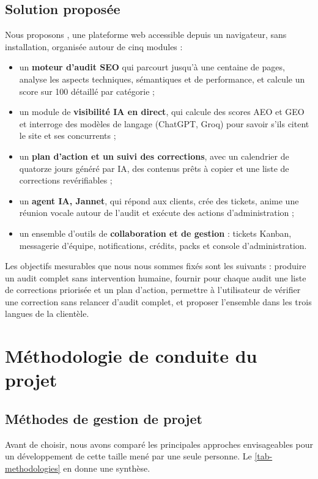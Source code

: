 \subsection{Solution proposée}
Nous proposons \xapp, une plateforme web accessible depuis un navigateur, sans installation, organisée autour de cinq modules :
\begin{itemize}
  \item un \textbf{moteur d'audit SEO} qui parcourt jusqu'à une centaine de pages, analyse les aspects techniques, sémantiques et de performance, et calcule un score sur 100 détaillé par catégorie ;
  \item un module de \textbf{visibilité IA en direct}, qui calcule des scores AEO et GEO et interroge des modèles de langage (ChatGPT, Groq) pour savoir s'ils citent le site et ses concurrents ;
  \item un \textbf{plan d'action et un suivi des corrections}, avec un calendrier de quatorze jours généré par IA, des contenus prêts à copier et une liste de corrections revérifiables ;
  \item un \textbf{agent IA, Jannet}, qui répond aux clients, crée des tickets, anime une réunion vocale autour de l'audit et exécute des actions d'administration ;
  \item un ensemble d'outils de \textbf{collaboration et de gestion} : tickets Kanban, messagerie d'équipe, notifications, crédits, packs et console d'administration.
\end{itemize}

Les objectifs mesurables que nous nous sommes fixés sont les suivants : produire un audit complet sans intervention humaine, fournir pour chaque audit une liste de corrections priorisée et un plan d'action, permettre à l'utilisateur de vérifier une correction sans relancer d'audit complet, et proposer l'ensemble dans les trois langues de la clientèle. 

\section{Méthodologie de conduite du projet}

\subsection{Méthodes de gestion de projet}
Avant de choisir, nous avons comparé les principales approches envisageables pour un développement de cette taille mené par une seule personne. Le \cref{tab-methodologies} en donne une synthèse.

